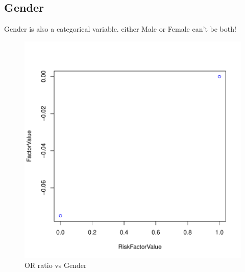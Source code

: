 \documentclass{report}
\begin{document}
\subsection{\color{green}Gender}
Gender is also a categorical variable. either Male or Female can't be both!
\begin{center}
\begin{figure}[H]
\includegraphics{EPFL-Gender}
\caption{OR ratio vs Gender}
\end{figure}
\end{center}

\newpage
\end{document}
